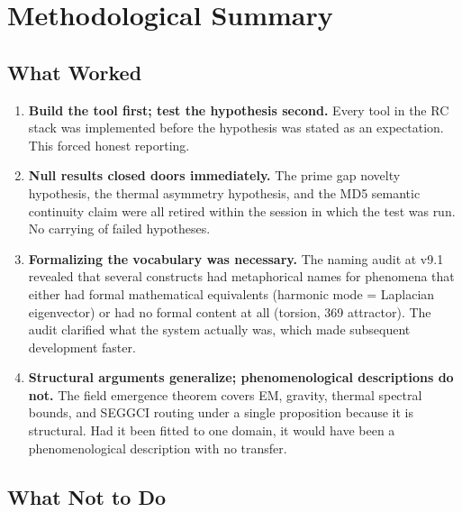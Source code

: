 \documentclass[11pt,twoside]{article}
\begin{document}
\section{Methodological Summary}

\subsection{What Worked}

\begin{enumerate}
  \item \textbf{Build the tool first; test the hypothesis second.} Every tool in the RC stack
  was implemented before the hypothesis was stated as an expectation. This forced honest reporting.

  \item \textbf{Null results closed doors immediately.} The prime gap novelty hypothesis,
  the thermal asymmetry hypothesis, and the MD5 semantic continuity claim were all retired
  within the session in which the test was run. No carrying of failed hypotheses.

  \item \textbf{Formalizing the vocabulary was necessary.} The naming audit at v9.1
  revealed that several constructs had metaphorical names for phenomena that either
  had formal mathematical equivalents (harmonic mode = Laplacian eigenvector) or
  had no formal content at all (torsion, 369 attractor). The audit clarified what
  the system actually was, which made subsequent development faster.

  \item \textbf{Structural arguments generalize; phenomenological descriptions do not.}
  The field emergence theorem covers EM, gravity, thermal spectral bounds, and SEGGCI
  routing under a single proposition because it is structural. Had it been fitted to
  one domain, it would have been a phenomenological description with no transfer.
\end{enumerate}

\subsection{What Not to Do}
\end{document}
